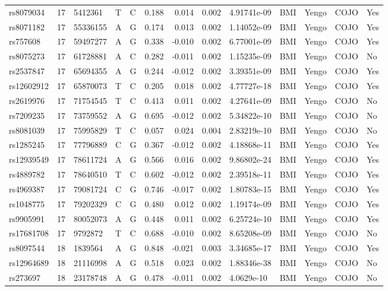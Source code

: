 \documentclass[11pt,twoside]{bristolthesis}
\begin{document}
\begin{longtable}[t]{lrlllrrrlllll}
rs8079034 & 17 & 5412361 & T & C & 0.188 & 0.014 & 0.002 & 4.91741e-09 & BMI & Yengo & COJO & Yes\\
rs8071182 & 17 & 55336155 & A & G & 0.174 & 0.013 & 0.002 & 1.14052e-09 & BMI & Yengo & COJO & Yes\\
\addlinespace
rs757608 & 17 & 59497277 & A & G & 0.338 & -0.010 & 0.002 & 6.77001e-09 & BMI & Yengo & COJO & Yes\\
rs8075273 & 17 & 61728881 & A & C & 0.282 & -0.011 & 0.002 & 1.15235e-09 & BMI & Yengo & COJO & No\\
rs2537847 & 17 & 65694355 & A & G & 0.244 & -0.012 & 0.002 & 3.39351e-09 & BMI & Yengo & COJO & Yes\\
rs12602912 & 17 & 65870073 & T & C & 0.205 & 0.018 & 0.002 & 4.77727e-18 & BMI & Yengo & COJO & Yes\\
rs2619976 & 17 & 71754545 & T & C & 0.413 & 0.011 & 0.002 & 4.27641e-09 & BMI & Yengo & COJO & No\\
\addlinespace
rs7209235 & 17 & 73759552 & A & G & 0.695 & -0.012 & 0.002 & 5.34822e-10 & BMI & Yengo & COJO & No\\
rs8081039 & 17 & 75995829 & T & C & 0.057 & 0.024 & 0.004 & 2.83219e-10 & BMI & Yengo & COJO & No\\
rs1285245 & 17 & 77796889 & C & G & 0.367 & -0.012 & 0.002 & 4.18868e-11 & BMI & Yengo & COJO & Yes\\
rs12939549 & 17 & 78611724 & A & G & 0.566 & 0.016 & 0.002 & 9.86802e-24 & BMI & Yengo & COJO & Yes\\
rs4889782 & 17 & 78640510 & T & C & 0.602 & -0.012 & 0.002 & 2.39518e-11 & BMI & Yengo & COJO & Yes\\
\addlinespace
rs4969387 & 17 & 79081724 & C & G & 0.746 & -0.017 & 0.002 & 1.80783e-15 & BMI & Yengo & COJO & Yes\\
rs1048775 & 17 & 79202329 & C & G & 0.480 & 0.012 & 0.002 & 1.19174e-09 & BMI & Yengo & COJO & Yes\\
rs9905991 & 17 & 80052073 & A & G & 0.448 & 0.011 & 0.002 & 6.25724e-10 & BMI & Yengo & COJO & Yes\\
rs17681708 & 17 & 9792872 & T & C & 0.688 & -0.010 & 0.002 & 8.65208e-09 & BMI & Yengo & COJO & No\\
rs8097544 & 18 & 1839564 & A & G & 0.848 & -0.021 & 0.003 & 3.34685e-17 & BMI & Yengo & COJO & Yes\\
\addlinespace
rs12964689 & 18 & 21116998 & A & G & 0.518 & 0.023 & 0.002 & 1.88346e-38 & BMI & Yengo & COJO & No\\
rs273697 & 18 & 23178748 & A & G & 0.478 & -0.011 & 0.002 & 4.0629e-10 & BMI & Yengo & COJO & No\\

\end{longtable}
\end{document}
